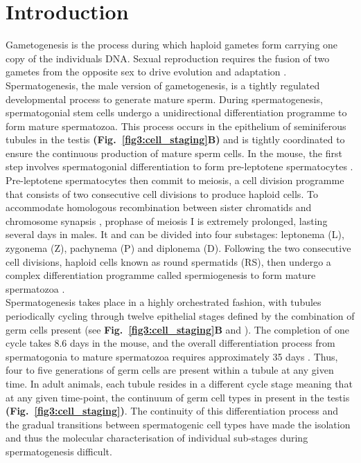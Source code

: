 
\section{Introduction}

Gametogenesis is the process during which haploid gametes form carrying one copy of the individuals DNA. Sexual reproduction requires the fusion of two gametes from the opposite sex to drive evolution and adaptation \citep{McDonald2016}. Spermatogenesis, the male version of gametogenesis, is a tightly regulated developmental process to generate mature sperm. 
During spermatogenesis, spermatogonial stem cells undergo a unidirectional differentiation programme to form mature spermatozoa. This process occurs in the epithelium of seminiferous tubules in the testis \textbf{(Fig.~\ref{fig3:cell_staging}B)} and is tightly coordinated to ensure the continuous production of mature sperm cells. In the mouse, the first step involves spermatogonial differentiation to form pre-leptotene spermatocytes \citep{Oakberg1971, DeRooij1973, DeRooij2000}. Pre-leptotene spermatocytes then commit to meiosis, a cell division programme that consists of two consecutive cell divisions to produce haploid cells. To accommodate homologous recombination between sister chromatids and chromosome synapsis \citep{Marston2004}, prophase of meiosis I is extremely prolonged, lasting several days in males. It and can be divided into four substages: leptonema (L), zygonema (Z), pachynema (P) and diplonema (D). Following the two consecutive cell divisions, haploid cells known as round spermatids (RS), then undergo a complex differentiation programme called spermiogenesis to form mature spermatozoa \citep{Oakberg1956}. \\

Spermatogenesis takes place in a highly orchestrated fashion, with tubules periodically cycling through twelve epithelial stages defined by the combination of germ cells present (see \textbf{Fig.~\ref{fig3:cell_staging}B} and \citep{Oakberg1956}). The completion of one cycle takes 8.6 days in the mouse, and the overall differentiation process from spermatogonia to mature spermatozoa requires approximately 35 days \citep{Oakberg1956a}. Thus, four to five generations of germ cells are present within a tubule at any given time. In adult animals, each tubule resides in a different cycle stage meaning that at any given time-point, the continuum of germ cell types in present in the testis \textbf{(Fig.~\ref{fig3:cell_staging})}. The continuity of this differentiation process and the gradual transitions between spermatogenic cell types have made the isolation and thus the molecular characterisation of individual sub-stages during spermatogenesis difficult.

